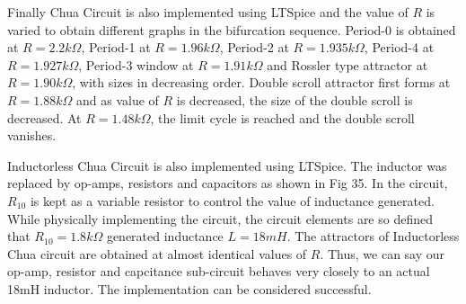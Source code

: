 \documentclass[12pt]{article}
\begin{document}
Finally Chua Circuit is also implemented using LTSpice and the value of $R$ is varied to obtain different graphs in the bifurcation sequence. Period-0 is obtained at $R=2.2k\Omega$, Period-1 at $R=1.96k\Omega$, Period-2 at $R=1.935k\Omega$, Period-4 at $R=1.927k\Omega$, Period-3 window at $R=1.91k\Omega$ and Rossler type attractor at $R=1.90k\Omega$, with sizes in decreasing order. Double scroll attractor first forms at $R=1.88k\Omega$ and as value of $R$ is decreased, the size of the double scroll is decreased. At $R=1.48k\Omega$, the limit cycle is reached and the double scroll vanishes. \linebreak

Inductorless Chua Circuit is also implemented using LTSpice. The inductor was replaced by op-amps, resistors and capacitors as shown in Fig 35. In the circuit, $R_{10}$ is kept as a variable resistor to control the value of inductance generated. While physically implementing the circuit, the circuit elements are so defined that $R_{10}=1.8k\Omega$ generated inductance $L=18mH$. The attractors of Inductorless Chua circuit are obtained at almost identical values of $R$. Thus, we can say our op-amp, resistor and capcitance sub-circuit behaves very closely to an actual 18mH inductor. The implementation can be considered successful.
\end{document}
